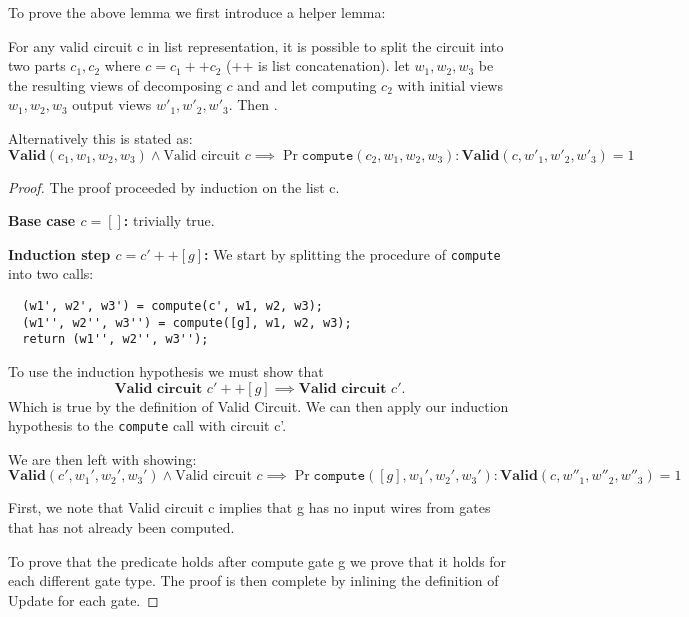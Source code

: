 To prove the above lemma we first introduce a helper lemma:

\begin{lemma}
  \label{lem:decompose_compute_step}
  For any valid circuit c in list representation, it is possible to split the circuit into two parts
  $c_{1}, c_{2}$ where $c = c_{1} ++ c_{2}$ (++ is list concatenation).
  let $w_{1}, w_{2}, w_{3}$ be the resulting views of decomposing $c$ and
   and let computing $c_{2}$ with initial
  views $w_{1}, w_{2}, w_{3}$ output views $w'_{1}, w'_{2}, w'_{3}$.
  Then .

  Alternatively this is stated as:
  \[
    \textbf{Valid}(c_{1}, w_{1}, w_{2}, w_{3}) \land \text{Valid circuit } c \implies
    \Pr{ \texttt{compute}(c_{2}, w_{1}, w_{2}, w_{3}) : \textbf{Valid}(c, w'_{1} , w'_{2}, w'_{3}) } = 1
  \]

\end{lemma}
\begin{proof}
  The proof proceeded by induction on the list c.

  \noindent \textbf{Base case $c = []$: } trivially true.

  \noindent \textbf{Induction step $c = c' ++ [g]$: }
  We start by splitting the procedure of \texttt{compute} into two calls:
\begin{lstlisting}
  (w1', w2', w3') = compute(c', w1, w2, w3);
  (w1'', w2'', w3'') = compute([g], w1, w2, w3);
  return (w1'', w2'', w3'');
\end{lstlisting}
  To use the induction hypothesis we must show that
  \[
    \textbf{Valid circuit } c'++[g] \implies
    \textbf{Valid circuit } c'.
  \]
  Which is true by the definition of Valid Circuit. We can then apply our
  induction hypothesis to the \texttt{compute} call with circuit c'.

  We are then left with showing:
  \[
    \textbf{Valid}(c', w_{1}', w_{2}', w_{3}') \land \text{Valid circuit } c \implies
    \Pr{ \texttt{compute}([g], w_{1}', w_{2}', w_{3}') : \textbf{Valid}(c, w''_{1} , w''_{2}, w''_{3}) } = 1
  \]

  First, we note that Valid circuit c implies that g has no input wires from
  gates that has not already been computed.

  To prove that the predicate holds after compute gate g we prove that it holds
  for each different gate type.
  The proof is then complete by inlining the definition of Update for each gate.
\end{proof}

